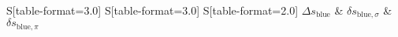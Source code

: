 \begin{table}
    \centering
    \caption{Abstände $\Delta s,\delta s$ in Pixel bei der blauen Linie}
    \label{tab:WerteFotosBlau}
    \begin{tabular}{
	S[table-format=3.0]
	S[table-format=3.0]
	S[table-format=2.0]
	}
	\toprule
	{$\Delta s_\mathrm{blue}$}		& {$\delta s_{\mathrm{blue,}\sigma}$}		& 
	{$\delta s_{\mathrm{blue,}\pi}$}		\\ 
	\midrule
    
    \bottomrule
    \end{tabular}
    \end{table}
